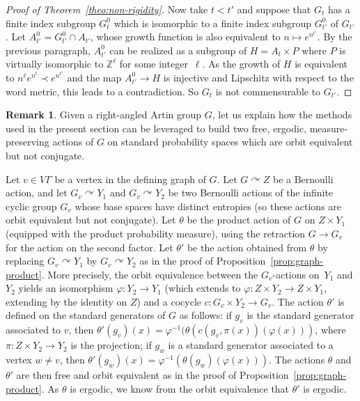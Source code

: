 \documentclass[JEP,XML,SOM,Unicode,NoFloatCountersInSection,published]{cedram}
\theoremstyle{plain}
\theoremstyle{definition}
\newtheorem{rk}[theo]{Remark}
\let\actson\curvearrowright
\begin{document}
\begin{proof}[Proof of Theorem~\ref{theo:non-rigidity}]
Now take $t<t'$ and suppose that $G_{t}$ has a finite index subgroup $G^0_t$ which is isomorphic to a finite index subgroup $G^0_{t'}$ of $G_{t'}$. Let $A^0_{t'}=G^0_{t'}\cap A_{t'}$, whose growth function is also equivalent to $n\mapsto e^{n^{t'}}$. By the previous paragraph, $A^0_{t'}$ can be realized as a subgroup of $H=A_t\times P$ where $P$ is virtually isomorphic to $\mathbb Z^\ell$ for some integer~$\ell$. As the growth of $H$ is equivalent to $n^\ell e^{n^{t}}\prec e^{n^{t'}}$ and the map $A^0_{t'}\to H$ is injective and Lipschitz with respect to the word metric, this leads to a contradiction. So $G_t$ is not commensurable to $G_{t'}$.
\end{proof}

\begin{rk}\label{rk:oe-non-conj}
Given a right-angled Artin group $G$, let us explain how the methods used in the present section can be leveraged to build two free, ergodic, measure-preserving actions of $G$ on standard probability spaces which are orbit equivalent but not conjugate.

Let $v\in V\Gamma$ be a vertex in the defining graph of $G$. Let $G\actson Z$ be a Bernoulli action, and let $G_v\actson Y_1$ and $G_v\actson Y_2$ be two Bernoulli actions of the infinite cyclic group $G_v$ whose base spaces have distinct entropies (so these actions are orbit equivalent but not conjugate). Let $\theta$ be the product action of $G$ on $Z\times Y_1$ (equipped with the product probability measure), using the retraction $G\to G_v$ for the action on the second factor. Let $\theta'$ be the action obtained from $\theta$ by replacing $G_v\actson Y_1$ by $G_v\actson Y_2$ as in the proof of Proposition~\ref{prop:graph-product}. More precisely, the orbit equivalence between the $G_v$-actions on~$Y_1$ and $Y_2$ yields an isomorphism $\varphi:Y_2\to Y_1$ (which extends to $\varphi:Z\times Y_2\to Z\times Y_1$, extending by the identity on $Z$) and a cocycle $c:G_v\times Y_2\to G_v$. The action $\theta'$ is defined on the standard generators of $G$ as follows: if $g_v$ is the standard generator associated to $v$, then $\theta'(g_v)(x)=\varphi^{-1}(\theta(c(g_v,\pi(x))(\varphi(x)))$, where $\pi:Z\times Y_2\to Y_2$ is the projection; if $g_w$ is a standard generator associated to a vertex $w\neq v$, then $\theta'(g_w)(x)=\varphi^{-1}(\theta(g_w)(\varphi(x)))$. The actions $\theta$ and $\theta'$ are then free and orbit equivalent as in the proof of Proposition~\ref{prop:graph-product}. As $\theta$ is ergodic, we know from the orbit equivalence that $\theta'$ is ergodic.


\end{rk}
\end{document}
